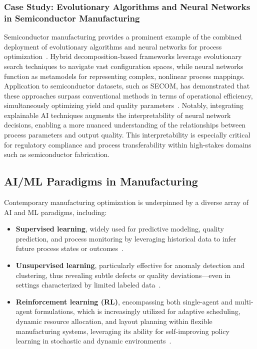 \documentclass[sigconf]{acmart}
\begin{document}
\subsubsection{Case Study: Evolutionary Algorithms and Neural Networks in Semiconductor Manufacturing}

Semiconductor manufacturing provides a prominent example of the combined deployment of evolutionary algorithms and neural networks for process optimization~\cite{ref22}. Hybrid decomposition-based frameworks leverage evolutionary search techniques to navigate vast configuration spaces, while neural networks function as metamodels for representing complex, nonlinear process mappings. Application to semiconductor datasets, such as SECOM, has demonstrated that these approaches surpass conventional methods in terms of operational efficiency, simultaneously optimizing yield and quality parameters~\cite{ref22}. Notably, integrating explainable AI techniques augments the interpretability of neural network decisions, enabling a more nuanced understanding of the relationships between process parameters and output quality. This interpretability is especially critical for regulatory compliance and process transferability within high-stakes domains such as semiconductor fabrication.

\subsection{AI/ML Paradigms in Manufacturing}

Contemporary manufacturing optimization is underpinned by a diverse array of AI and ML paradigms, including:
\begin{itemize}
    \item \textbf{Supervised learning}, widely used for predictive modeling, quality prediction, and process monitoring by leveraging historical data to infer future process states or outcomes~\cite{ref2,ref6,ref13,ref14,ref19,ref20,ref27,ref30,ref37,ref38,ref42,ref44,ref45,ref50,ref52}.
    \item \textbf{Unsupervised learning}, particularly effective for anomaly detection and clustering, thus revealing subtle defects or quality deviations—even in settings characterized by limited labeled data~\cite{ref20,ref27}.
    \item \textbf{Reinforcement learning (RL)}, encompassing both single-agent and multi-agent formulations, which is increasingly utilized for adaptive scheduling, dynamic resource allocation, and layout planning within flexible manufacturing systems, leveraging its ability for self-improving policy learning in stochastic and dynamic environments~\cite{ref6,ref13,ref14,ref19,ref30,ref38,ref44,ref56}.
\end{itemize}
\end{document}
